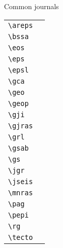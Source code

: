Common journals
\newline
\begin{tabular}{ll}
\verb"\areps" & \areps{} \\
\verb"\bssa"  & \bssa{} \\
\verb"\eos"   & \eos{}  \\
\verb"\eps"   & \eps{} \\
\verb"\epsl"  & \epsl{} \\
\verb"\gca"   & \gca{} \\
\verb"\geo"   & \geo{} \\
\verb"\geop"  & \geop{} \\
\verb"\gji"   & \gji{} \\
\verb"\gjras" & \gjras{} \\
\verb"\grl"   & \grl{} \\
\verb"\gsab"  & \gsab{} \\
\verb"\gs"    & \gs{} \\
\verb"\jgr"   & \jgr{} \\
\verb"\jseis" & \jseis{} \\
\verb"\mnras" & \mnras{} \\
\verb"\pag"   & \pag{} \\
\verb"\pepi"  & \pepi{} \\
\verb"\rg"    & \rg{} \\
\verb"\tecto" & \tecto{} \\
\end{tabular}
%
%
